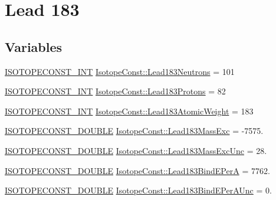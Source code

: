 \hypertarget{group___isotope_const-_lead-_pb183}{}\section{Lead 183}
\label{group___isotope_const-_lead-_pb183}
\subsection*{Variables}
\begin{DoxyCompactItemize}
\item 
\mbox{\hyperlink{group___isotope_const-_macros_ga5f18360b3e99483a35c32d789e62621c}{I\+S\+O\+T\+O\+P\+E\+C\+O\+N\+S\+T\+\_\+\+I\+NT}} \mbox{\hyperlink{group___isotope_const-_lead-_pb183_ga595e396b762171e679263ea3220bbfd9}{Isotope\+Const\+::\+Lead183\+Neutrons}} = 101
\item 
\mbox{\hyperlink{group___isotope_const-_macros_ga5f18360b3e99483a35c32d789e62621c}{I\+S\+O\+T\+O\+P\+E\+C\+O\+N\+S\+T\+\_\+\+I\+NT}} \mbox{\hyperlink{group___isotope_const-_lead-_pb183_gacb8c12161f0e7469c0044e5618512d35}{Isotope\+Const\+::\+Lead183\+Protons}} = 82
\item 
\mbox{\hyperlink{group___isotope_const-_macros_ga5f18360b3e99483a35c32d789e62621c}{I\+S\+O\+T\+O\+P\+E\+C\+O\+N\+S\+T\+\_\+\+I\+NT}} \mbox{\hyperlink{group___isotope_const-_lead-_pb183_gae2d00397fe1c8482911753589697fdca}{Isotope\+Const\+::\+Lead183\+Atomic\+Weight}} = 183
\item 
\mbox{\hyperlink{group___isotope_const-_macros_ga8f45a7272ce02c0b4c65c44636ed719a}{I\+S\+O\+T\+O\+P\+E\+C\+O\+N\+S\+T\+\_\+\+D\+O\+U\+B\+LE}} \mbox{\hyperlink{group___isotope_const-_lead-_pb183_ga8aa13a2f61009864e5f8ca3b59f506eb}{Isotope\+Const\+::\+Lead183\+Mass\+Exc}} = -\/7575.
\item 
\mbox{\hyperlink{group___isotope_const-_macros_ga8f45a7272ce02c0b4c65c44636ed719a}{I\+S\+O\+T\+O\+P\+E\+C\+O\+N\+S\+T\+\_\+\+D\+O\+U\+B\+LE}} \mbox{\hyperlink{group___isotope_const-_lead-_pb183_gab6d8a3476cc1dceac8346837164aca53}{Isotope\+Const\+::\+Lead183\+Mass\+Exc\+Unc}} = 28.
\item 
\mbox{\hyperlink{group___isotope_const-_macros_ga8f45a7272ce02c0b4c65c44636ed719a}{I\+S\+O\+T\+O\+P\+E\+C\+O\+N\+S\+T\+\_\+\+D\+O\+U\+B\+LE}} \mbox{\hyperlink{group___isotope_const-_lead-_pb183_ga9a6da8696ea9afbfb9dc2402732ee7cc}{Isotope\+Const\+::\+Lead183\+Bind\+E\+PerA}} = 7762.
\item 
\mbox{\hyperlink{group___isotope_const-_macros_ga8f45a7272ce02c0b4c65c44636ed719a}{I\+S\+O\+T\+O\+P\+E\+C\+O\+N\+S\+T\+\_\+\+D\+O\+U\+B\+LE}} \mbox{\hyperlink{group___isotope_const-_lead-_pb183_gac79df5a328ba2de2c0bf590214208a82}{Isotope\+Const\+::\+Lead183\+Bind\+E\+Per\+A\+Unc}} = 0.

\end{DoxyCompactItemize}
